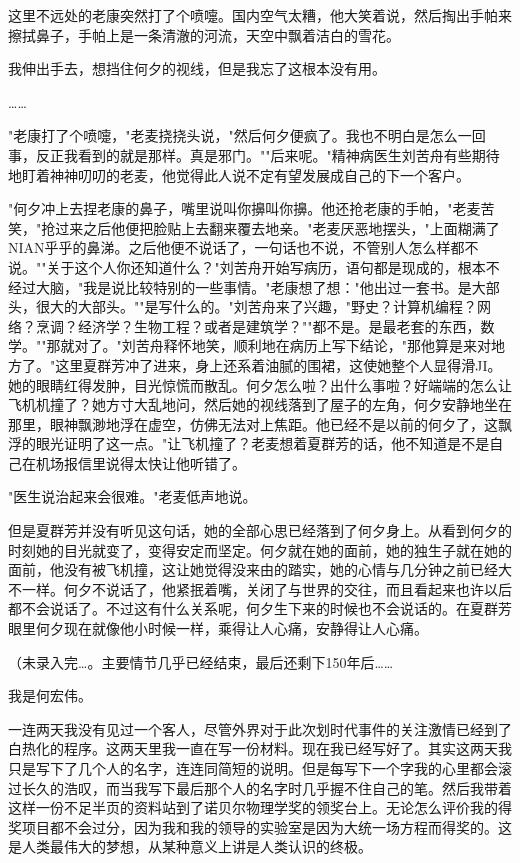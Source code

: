 \documentclass[UTF8]{ctexart}
\begin{document}
这里不远处的老康突然打了个喷嚏。国内空气太糟，他大笑着说，然后掏出手帕来擦拭鼻子，手帕上是一条清澈的河流，天空中飘着洁白的雪花。

我伸出手去，想挡住何夕的视线，但是我忘了这根本没有用。

……

"老康打了个喷嚏，"老麦挠挠头说，"然后何夕便疯了。我也不明白是怎么一回事，反正我看到的就是那样。真是邪门。""后来呢。"精神病医生刘苦舟有些期待地盯着神神叨叨的老麦，他觉得此人说不定有望发展成自己的下一个客户。

"何夕冲上去捏老康的鼻子，嘴里说叫你擤叫你擤。他还抢老康的手帕，"老麦苦笑，"抢过来之后他便把脸贴上去翻来覆去地亲。"老麦厌恶地摆头，"上面糊满了NIAN乎乎的鼻涕。之后他便不说话了，一句话也不说，不管别人怎么样都不说。""关于这个人你还知道什么？"刘苦舟开始写病历，语句都是现成的，根本不经过大脑，"我是说比较特别的一些事情。"老康想了想："他出过一套书。是大部头，很大的大部头。""是写什么的。"刘苦舟来了兴趣，"野史？计算机编程？网络？烹调？经济学？生物工程？或者是建筑学？""都不是。是最老套的东西，数学。""那就对了。"刘苦舟释怀地笑，顺利地在病历上写下结论，"那他算是来对地方了。"这里夏群芳冲了进来，身上还系着油腻的围裙，这使她整个人显得滑JI。她的眼睛红得发肿，目光惊慌而散乱。何夕怎么啦？出什么事啦？好端端的怎么让飞机机撞了？她方寸大乱地问，然后她的视线落到了屋子的左角，何夕安静地坐在那里，眼神飘渺地浮在虚空，仿佛无法对上焦距。他已经不是以前的何夕了，这飘浮的眼光证明了这一点。"让飞机撞了？老麦想着夏群芳的话，他不知道是不是自己在机场报信里说得太快让他听错了。

"医生说治起来会很难。"老麦低声地说。

但是夏群芳并没有听见这句话，她的全部心思已经落到了何夕身上。从看到何夕的时刻她的目光就变了，变得安定而坚定。何夕就在她的面前，她的独生子就在她的面前，他没有被飞机撞，这让她觉得没来由的踏实，她的心情与几分钟之前已经大不一样。何夕不说话了，他紧抿着嘴，关闭了与世界的交往，而且看起来也许以后都不会说话了。不过这有什么关系呢，何夕生下来的时候也不会说话的。在夏群芳眼里何夕现在就像他小时候一样，乘得让人心痛，安静得让人心痛。

（未录入完…。主要情节几乎已经结束，最后还剩下150年后……

我是何宏伟。

一连两天我没有见过一个客人，尽管外界对于此次划时代事件的关注激情已经到了白热化的程序。这两天里我一直在写一份材料。现在我已经写好了。其实这两天我只是写下了几个人的名字，连连同简短的说明。但是每写下一个字我的心里都会滚过长久的浩叹，而当我写下最后那个人的名字时几乎握不住自己的笔。然后我带着这样一份不足半页的资料站到了诺贝尔物理学奖的领奖台上。无论怎么评价我的得奖项目都不会过分，因为我和我的领导的实验室是因为大统一场方程而得奖的。这是人类最伟大的梦想，从某种意义上讲是人类认识的终极。
\end{document}

